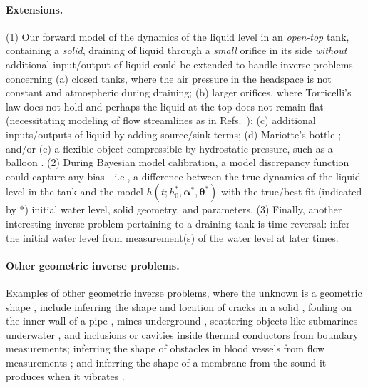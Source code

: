 \documentclass[openacc]{rsproca_new}%
\begin{document}
\paragraph{Extensions.}
(1) Our forward model of the dynamics of the liquid level in an \emph{open-top} tank, containing a \emph{solid}, draining of liquid through a \emph{small} orifice in its side \emph{without} additional input/output of liquid could be extended to handle inverse problems concerning
(a) closed tanks, where the air pressure in the headspace is not constant and atmospheric during draining; 
(b) larger orifices, where Torricelli's law does not hold and perhaps the liquid at the top does not remain flat (necessitating modeling of flow streamlines as in Refs.~\cite{mathew2014numerical,sakri2017numerical});
(c) additional inputs/outputs of liquid by adding source/sink terms; 
(d) Mariotte's bottle \cite{kirevs2006mariotte}; and/or
(e) a flexible object compressible by hydrostatic pressure, such as a balloon \cite{muller2004rubber}. 
(2) During Bayesian model calibration, a model discrepancy \cite{brynjarsdottir2014learning,kennedy2001bayesian} function could capture any bias---i.e., a difference between the true dynamics of the liquid level in the tank and the model $h(t; h_0^*,  \boldsymbol \alpha^*, \boldsymbol \theta^*)$ with the true/best-fit (indicated by $*$) initial water level, solid geometry, and parameters.
(3) Finally, another interesting inverse problem pertaining to a draining tank is time reversal: infer the initial water level from measurement(s) of the water level at later times.

\paragraph{Other geometric inverse problems.}
Examples of other geometric inverse problems, where the unknown is a geometric shape \cite{ameur2004level,burger2001level,harbrecht2013numerical,kawakami2020stabilities}, include inferring the shape and location of cracks in a solid \cite{nishimura1991boundary}, fouling on the inner wall of a pipe \cite{chen2011inverse}, mines underground \cite{delbary2007inverse,lopez2003detection}, scattering objects like submarines \cite{yaman2013survey} underwater \cite{buchanan2004marine}, and inclusions or cavities inside thermal conductors \cite{wang2018numerical,nakamura2015reconstruction}
 from boundary measurements; inferring the shape of obstacles in blood vessels from flow measurements \cite{aguayo2021distributed,nolte2022inverse}; and inferring the shape of a membrane from the sound it produces when it vibrates \cite{kac1966can}. 
\end{document}
